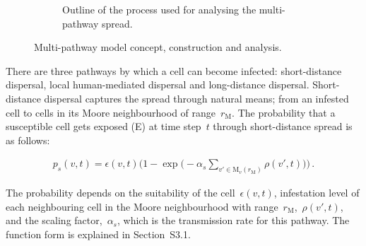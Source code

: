 \documentclass[11pt]{article}
\newcommand{\infest}{\rho}
\newcommand{\suitable}{\epsilon}
\newcommand{\pshort}{p_s}
\newcommand{\asd}{\alpha_s}
\newcommand{\moore}{\mathrm{M}}
\newcommand{\mooreRange}{r_\mathrm{M}}
\theoremstyle{definition}
\begin{document}
\begin{figure}[t]
\begin{subfigure}[b]{.8\textwidth}
    \caption{Outline of the process used for analysing the multi-pathway spread. \label{fig:clusterOutline}}
\end{subfigure}
\caption{Multi-pathway model concept, construction and analysis.}
\end{figure}

There are three pathways by which a cell can become infected:
short-distance dispersal, local human-mediated dispersal and long-distance
dispersal. Short-distance dispersal captures the spread through natural
means; from an infested cell to cells in its Moore neighbourhood of
range~$\mooreRange$.  The probability that a susceptible cell gets exposed
(E) at time step~$t$ through short-distance spread is as follows:
\begin{linenomath}
\begin{align}\label{eqn:pshort}
    \pshort(v,t)=\suitable(v,t)\bigg(1-
    \exp\Big(-\asd\sum_{v'\in\moore_v(\mooreRange)}\infest(v',t)\Big)\bigg)\,.
\end{align}
\end{linenomath}
The probability depends on the suitability of the cell~$\suitable(v,t)$,
infestation level of each neighbouring cell in the Moore neighbourhood with
range~$\mooreRange$,~$\infest(v',t)$, and the scaling factor,~$\asd$, which
is the transmission rate for this pathway. The function form is explained
in Section~S3.1.
\end{document}
